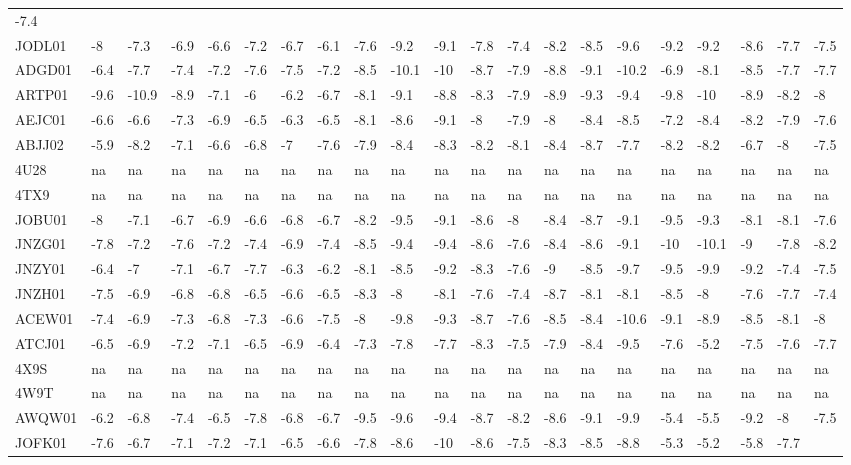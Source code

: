 \documentclass[12pt,twoside]{reedthesis}
\begin{document}
\begin{longtable}[c]{@{}lllllllllllllllllllll@{}}
  -7.4\tabularnewline
  JODL01 & -8 & -7.3 & -6.9 & -6.6 & -7.2 & -6.7 & -6.1 & -7.6 & -9.2 &
  -9.1 & -7.8 & -7.4 & -8.2 & -8.5 & -9.6 & -9.2 & -9.2 & -8.6 & -7.7 &
  -7.5\tabularnewline
  ADGD01 & -6.4 & -7.7 & -7.4 & -7.2 & -7.6 & -7.5 & -7.2 & -8.5 & -10.1 &
  -10 & -8.7 & -7.9 & -8.8 & -9.1 & -10.2 & -6.9 & -8.1 & -8.5 & -7.7 &
  -7.7\tabularnewline
  ARTP01 & -9.6 & -10.9 & -8.9 & -7.1 & -6 & -6.2 & -6.7 & -8.1 & -9.1 &
  -8.8 & -8.3 & -7.9 & -8.9 & -9.3 & -9.4 & -9.8 & -10 & -8.9 & -8.2 &
  -8\tabularnewline
  AEJC01 & -6.6 & -6.6 & -7.3 & -6.9 & -6.5 & -6.3 & -6.5 & -8.1 & -8.6 &
  -9.1 & -8 & -7.9 & -8 & -8.4 & -8.5 & -7.2 & -8.4 & -8.2 & -7.9 &
  -7.6\tabularnewline
  ABJJ02 & -5.9 & -8.2 & -7.1 & -6.6 & -6.8 & -7 & -7.6 & -7.9 & -8.4 &
  -8.3 & -8.2 & -8.1 & -8.4 & -8.7 & -7.7 & -8.2 & -8.2 & -6.7 & -8 &
  -7.5\tabularnewline
  4U28 & na & na & na & na & na & na & na & na & na & na & na & na & na &
  na & na & na & na & na & na & na\tabularnewline
  4TX9 & na & na & na & na & na & na & na & na & na & na & na & na & na &
  na & na & na & na & na & na & na\tabularnewline
  JOBU01 & -8 & -7.1 & -6.7 & -6.9 & -6.6 & -6.8 & -6.7 & -8.2 & -9.5 &
  -9.1 & -8.6 & -8 & -8.4 & -8.7 & -9.1 & -9.5 & -9.3 & -8.1 & -8.1 &
  -7.6\tabularnewline
  JNZG01 & -7.8 & -7.2 & -7.6 & -7.2 & -7.4 & -6.9 & -7.4 & -8.5 & -9.4 &
  -9.4 & -8.6 & -7.6 & -8.4 & -8.6 & -9.1 & -10 & -10.1 & -9 & -7.8 &
  -8.2\tabularnewline
  JNZY01 & -6.4 & -7 & -7.1 & -6.7 & -7.7 & -6.3 & -6.2 & -8.1 & -8.5 &
  -9.2 & -8.3 & -7.6 & -9 & -8.5 & -9.7 & -9.5 & -9.9 & -9.2 & -7.4 &
  -7.5\tabularnewline
  JNZH01 & -7.5 & -6.9 & -6.8 & -6.8 & -6.5 & -6.6 & -6.5 & -8.3 & -8 &
  -8.1 & -7.6 & -7.4 & -8.7 & -8.1 & -8.1 & -8.5 & -8 & -7.6 & -7.7 &
  -7.4\tabularnewline
  ACEW01 & -7.4 & -6.9 & -7.3 & -6.8 & -7.3 & -6.6 & -7.5 & -8 & -9.8 &
  -9.3 & -8.7 & -7.6 & -8.5 & -8.4 & -10.6 & -9.1 & -8.9 & -8.5 & -8.1 &
  -8\tabularnewline
  ATCJ01 & -6.5 & -6.9 & -7.2 & -7.1 & -6.5 & -6.9 & -6.4 & -7.3 & -7.8 &
  -7.7 & -8.3 & -7.5 & -7.9 & -8.4 & -9.5 & -7.6 & -5.2 & -7.5 & -7.6 &
  -7.7\tabularnewline
  4X9S & na & na & na & na & na & na & na & na & na & na & na & na & na &
  na & na & na & na & na & na & na\tabularnewline
  4W9T & na & na & na & na & na & na & na & na & na & na & na & na & na &
  na & na & na & na & na & na & na\tabularnewline
  AWQW01 & -6.2 & -6.8 & -7.4 & -6.5 & -7.8 & -6.8 & -6.7 & -9.5 & -9.6 &
  -9.4 & -8.7 & -8.2 & -8.6 & -9.1 & -9.9 & -5.4 & -5.5 & -9.2 & -8 &
  -7.5\tabularnewline
  JOFK01 & -7.6 & -6.7 & -7.1 & -7.2 & -7.1 & -6.5 & -6.6 & -7.8 & -8.6 &
  -10 & -8.6 & -7.5 & -8.3 & -8.5 & -8.8 & -5.3 & -5.2 & -5.8 & -7.7 &

\end{longtable}
\end{document}
